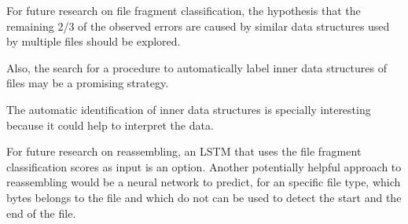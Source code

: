 For future research on file fragment classification, the hypothesis that the remaining 2/3 of the observed errors are caused by similar data structures used by multiple files should be explored.

Also, the search for a procedure to automatically label inner data structures of files may be a promising strategy. {\color{red}The automatic identification of inner data structures is specially interesting because it could help to interpret the data.

For future research on reassembling, an LSTM that uses the file fragment classification scores as input is an option. Another potentially helpful approach to reassembling would be a neural network to predict, for an specific file type, which bytes belongs to the file and which do not can be used to detect the start and the end of the file.
}









